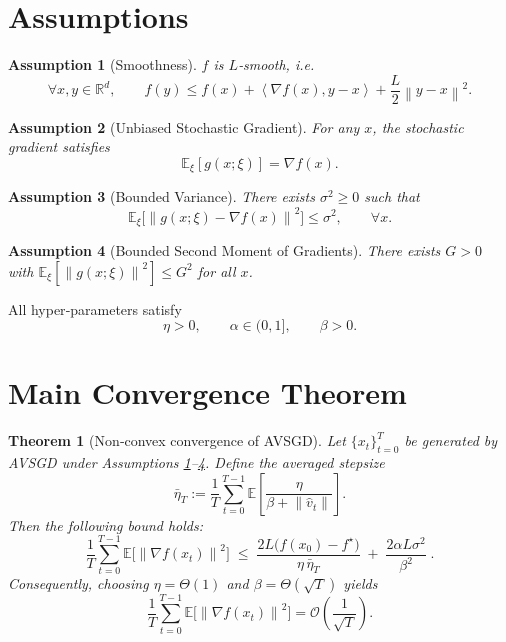 \documentclass{article}
\newtheorem{theorem}{Theorem}
\newtheorem{assumption}{Assumption}
\newcommand{\E}{\mathbb{E}}
\newcommand{\norm}[1]{\left\|#1\right\|}
\newcommand{\ip}[2]{\left\langle #1, #2 \right\rangle}
\newcommand{\grad}{\nabla}
\begin{document}
\section*{Assumptions}
\begin{assumption}[Smoothness]\label{ass:smooth}
$f$ is $L$‑smooth, i.e.
\[
\forall x,y\in\mathbb{R}^d,\qquad 
f(y)\le f(x)+\ip{\grad f(x)}{y-x}+\frac{L}{2}\norm{y-x}^2 .
\]
\end{assumption}
\begin{assumption}[Unbiased Stochastic Gradient]\label{ass:unbiased}
For any $x$, the stochastic gradient satisfies
\[
\E_{\xi}[g(x;\xi)] = \grad f(x) .
\]
\end{assumption}
\begin{assumption}[Bounded Variance]\label{ass:variance}
There exists $\sigma^2\ge0$ such that
\[
\E_{\xi}\!\big[\norm{g(x;\xi)-\grad f(x)}^2\big]\le\sigma^2,\qquad\forall x .
\]
\end{assumption}
\begin{assumption}[Bounded Second Moment of Gradients]\label{ass:gradbound}
There exists $G>0$ with $\E_{\xi}[\norm{g(x;\xi)}^2]\le G^2$ for all $x$.
\end{assumption}
All hyper‑parameters satisfy
\[
\eta>0,\qquad\alpha\in(0,1],\qquad \beta>0 .
\]

\section*{Main Convergence Theorem}
\begin{theorem}[Non‑convex convergence of AVSGD]\label{thm:main}
Let $\{x_t\}_{t=0}^{T}$ be generated by AVSGD under Assumptions \ref{ass:smooth}–\ref{ass:gradbound}.  
Define the averaged stepsize
\[
\bar\eta_T:=\frac{1}{T}\sum_{t=0}^{T-1}\E\!\left[\frac{\eta}{\beta+\norm{\hat v_t}}\right].
\]
Then the following bound holds:
\[
\frac{1}{T}\sum_{t=0}^{T-1}\E\!\big[\norm{\grad f(x_t)}^2\big]
\;\le\;
\frac{2L\big(f(x_0)-f^\star\big)}{\eta\,\bar\eta_T}
\;+\;
\frac{2\alpha L\sigma^2}{\beta^2}\; .
\tag{1}
\]
Consequently, choosing $\eta=\Theta(1)$ and $\beta=\Theta(\sqrt{T})$ yields
\[
\frac{1}{T}\sum_{t=0}^{T-1}\E\!\big[\norm{\grad f(x_t)}^2\big]=\mathcal{O}\!\left(\frac{1}{\sqrt{T}}\right).
\]
\end{theorem}
\end{document}

